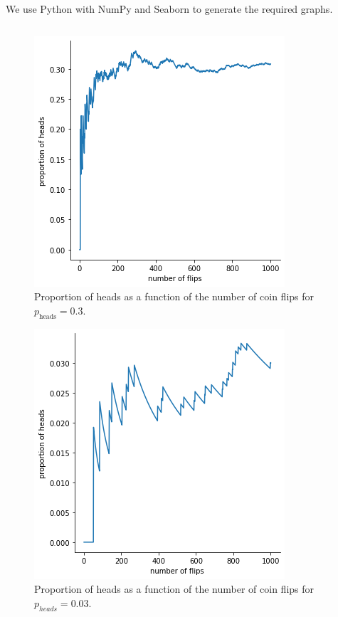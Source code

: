 \begin{ex}
  We use Python with NumPy and Seaborn to generate the required graphs.
  \inputminted{python}{src/01-21.py}

  \begin{figure}[H]
    \centering
    \includegraphics[scale=0.7]{part1/ch01-21a}
    \caption{Proportion of heads as a function of the number of coin flips for
      $p_\text{heads}=0.3$.}
  \end{figure}

  \begin{figure}[H]
    \centering
    \includegraphics[scale=0.7]{part1/ch01-21b}
    \caption{Proportion of heads as a function of the number of coin flips for
      $p_{heads}=0.03$.}
  \end{figure}

\end{ex}

